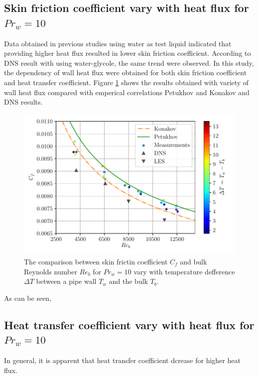 \documentclass[12pt,oneside]{jbook}
\begin{document}


\clearpage
\subsection{Skin friction coefficient vary with heat flux for $Pr_{w}=10$}
Data obtained in previous studies \cite{Everts2018} using water as test liquid indicated that providing higher heat flux resulted in lower skin friction coefficient.
According to DNS result with using water-glycole, the same trend were observed.
In this study, the dependency of wall heat flux were obtained for both skin friction coefficient and heat transfer coefficient.
Figure \ref{pr10_recf_heatflux} shows the results obtained with variety of wall heat flux compared with emperical correlations Petukhov and Konakov \cite{Petukhov1970} and DNS results.

\begin{figure}[ht]
	\vspace{0zh}
	\begin{center}
		\includegraphics[width=1\linewidth]{fig/pr10heatflux_recfdt.pdf}
		\vspace{-3zh}
		\caption{The comparison between skin frictin coefficient $C_{f}$ and bulk Reynolds number $Re_{b}$ for $Pr_{w} = 10$ vary with temperature defference $\Delta T$ between a pipe wall $T_{w}$ and the bulk $T_{b}$.}
		\label{pr10_recf_heatflux}
	\end{center}
	\vspace{0zh}
\end{figure}

As can be seen,

\clearpage
\subsection{Heat transfer coefficient vary with heat flux for $Pr_{w}=10$}
In general, it is apparent that heat transfer coefficient dcrease for higher heat flux.
\end{document}
